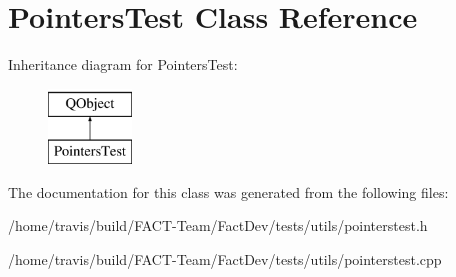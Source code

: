 \hypertarget{classPointersTest}{\section{Pointers\-Test Class Reference}
\label{classPointersTest}
}
Inheritance diagram for Pointers\-Test\-:\begin{figure}[H]
\begin{center}
\leavevmode
\includegraphics[height=2.000000cm]{d8/d62/classPointersTest}
\end{center}
\end{figure}


The documentation for this class was generated from the following files\-:\begin{DoxyCompactItemize}
\item 
/home/travis/build/\-F\-A\-C\-T-\/\-Team/\-Fact\-Dev/tests/utils/pointerstest.\-h\item 
/home/travis/build/\-F\-A\-C\-T-\/\-Team/\-Fact\-Dev/tests/utils/pointerstest.\-cpp\end{DoxyCompactItemize}
